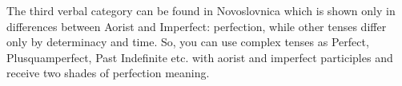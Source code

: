 The third verbal category can be found in Novoslovnica which is shown only in differences between Aorist and Imperfect: perfection, while other tenses differ only by determinacy and time. So, you can use complex tenses as Perfect, Plusquamperfect, Past Indefinite etc. with aorist and imperfect participles and receive two shades of perfection meaning.
